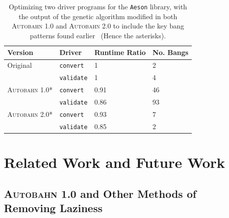 \documentclass[format=sigplan, review=true, 9pt]{acmart}
\newcommand{\Ao}[0]{\textsc{Autobahn 1.0}}
\newcommand{\At}[0]{\textsc{Autobahn 2.0}}
\newcommand{\preopt}[0]{pre-search}
\begin{document}
{%



\begin{table}
\begin{tabular}{p{2.5cm}p{1.5cm}p{1.5cm}p{1.5cm}}
\hline
Version   & Driver & Runtime Ratio & No. Bangs\\
\hline
Original      & \texttt{convert}   & 1     &  2\\
              & \texttt{validate}  & 1     &  4\\
\Ao{}*        & \texttt{convert}   & 0.91  & 46\\
              & \texttt{validate}  & 0.86  & 93\\
\At{}*        & \texttt{convert}   & 0.93  &  7\\
              & \texttt{validate}  & 0.85  &  2\\
\hline
\end{tabular}
\caption{Optimizing two driver programs for
the \texttt{Aeson} library, with the output of the genetic algorithm 
modified in both \Ao{} and \At{} to include the key bang patterns
found earlier~\cite{autobahn-wang} (Hence the asterisks).} 
\label{tab:aeson}
\end{table}
}

\section{Related Work and Future Work}

\subsection{\Ao{} and Other Methods of Removing Laziness}
\end{document}
